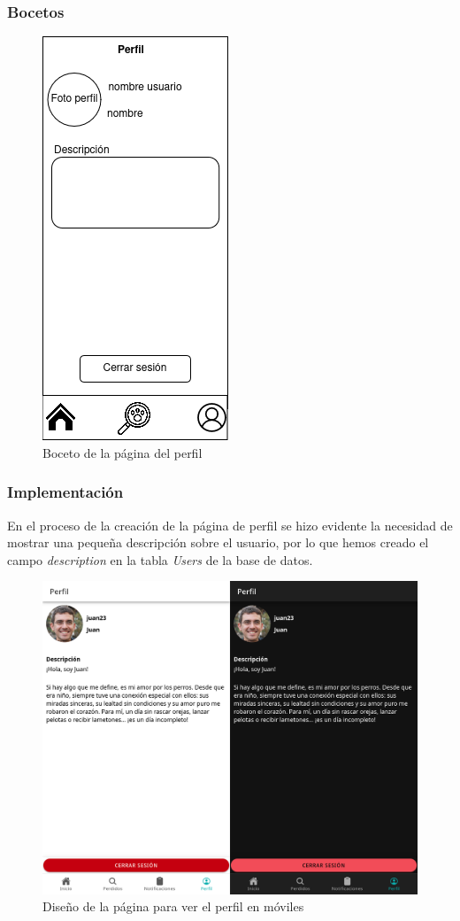\subsubsection{Bocetos}
\begin{figure}[H]
	\centering
	\includegraphics[width=0.25\linewidth]{sprint 3//hu11-12/boceto.png}
	\caption{Boceto de la página del perfil}
\end{figure}

\subsubsection{Implementación}

En el proceso de la creación de la página de perfil se hizo evidente la necesidad de mostrar una pequeña descripción sobre el usuario, por lo que hemos creado el campo \textit{description} en la tabla \textit{Users} de la base de datos.

\begin{figure} [H]
	\centering
	\includegraphics[width=0.8\linewidth]{sprint 3//hu11-12/implementacion.png}
	\caption{Diseño de la página para ver el perfil en móviles}
	\label{fig:impPerfil}
\end{figure}

